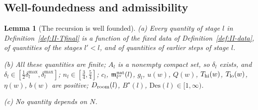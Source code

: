 \documentclass[10pt]{amsart}
\newtheorem{lemma}[theorem]{Lemma}
\theoremstyle{definition}
\theoremstyle{remark}
\begin{document}
\subsection{Well-foundedness and admissibility}

\begin{lemma}[The recursion is well founded]\label{lem:II-W}
\textup{(a)} Every quantity of stage $l$ in
Definition~\ref{def:II-Tfinal} is a function of the fixed data of
Definition~\ref{def:II-data}, of quantities of the stages $l'<l$, and of
quantities of earlier steps of stage $l$.

\textup{(b)} All these quantities are finite; $A_l$ is a nonempty compact
set, so $\delta_l$ exists, and $\delta_l\in[\frac12\delta^{\max}_l,
\delta^{\max}_l]$; $n_l\in[\frac34,\frac54]$; $c_l$,
$\mathfrak m^{\rm nat}_{l''}(l)$, $g_l$, $u(w)$, $Q(w)$, $T_{\rm hi}(w)$,
$T_{\rm lo}(w)$, $\eta(w)$, $b(w)$ are positive; $D_{\rm room}(l)$,
$B^\star(l)$, $\mathrm{Des}(l)\in[1,\infty)$.

\textup{(c)} No quantity depends on $N$.
\end{lemma}
\end{document}
